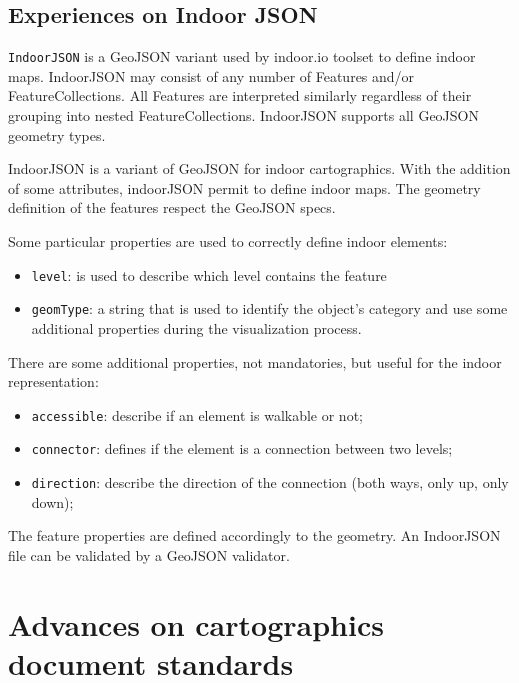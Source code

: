\documentclass[]{article}
\begin{document}
\subsection{Experiences on Indoor
JSON}\label{experiences-on-indoor-json}

\texttt{IndoorJSON} is a GeoJSON variant used by indoor.io toolset to
define indoor maps. IndoorJSON may consist of any number of Features
and/or FeatureCollections. All Features are interpreted similarly
regardless of their grouping into nested FeatureCollections. IndoorJSON
supports all GeoJSON geometry types.

IndoorJSON is a variant of GeoJSON for indoor cartographics. With the
addition of some attributes, indoorJSON permit to define indoor maps.
The geometry definition of the features respect the GeoJSON specs.

Some particular properties are used to correctly define indoor elements:

\begin{itemize}
\itemsep1pt\parskip0pt
\item
  \texttt{level}: is used to describe which level contains the feature
\item
  \texttt{geomType}: a string that is used to identify the object's
  category and use some additional properties during the visualization
  process.
\end{itemize}

There are some additional properties, not mandatories, but useful for
the indoor representation:

\begin{itemize}
\itemsep1pt\parskip0pt
\item
  \texttt{accessible}: describe if an element is walkable or not;
\item
  \texttt{connector}: defines if the element is a connection between two
  levels;
\item
  \texttt{direction}: describe the direction of the connection (both
  ways, only up, only down);
\end{itemize}

The feature properties are defined accordingly to the geometry. An
IndoorJSON file can be validated by a GeoJSON validator.

\section{Advances on cartographics document
standards}\label{advances-on-cartographics-document-standards}
\end{document}
